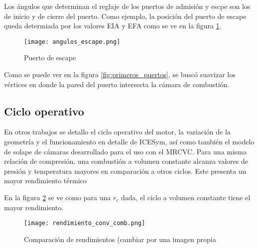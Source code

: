Los ángulos que determinan el reglaje de los puertos de admisión y escpe
son los de inicio y de cierre del puerto.
%
Como ejemplo, la posición del puerto de escape queda determiada por los 
valores EIA y EFA como se ve en la figura \ref{fig:angulos_escape}.

\begin{figure}
    \centering
    \texttt{[image: angulos\_escape.png]}
    \caption{Puerto de escape}
    \label{fig:angulos_escape}
\end{figure}

Como se puede ver en la figura \ref{fig:primeros_puertos}, se buscó suavizar
los vértices en donde la pared del puerto intersecta la cámara de combustión.
%


\subsection{Ciclo operativo}
En otros trabajos se detallo el ciclo operativo del motor, la variación de la
geometría y el funcionamiento en detalle de ICESym, así como también el modelo
de solape de cámaras desarrollado para el uso con el MRCVC.
%
Para una misma relación de compresión, una combustión a volumen constante
alcanza valores de presión y temperatura mayores en comparación a otros ciclos.
%
Este presenta un mayor rendimiento térmico


En la figura \ref{fig:comparacion_rendimientos} se ve como para una $r_c$ dada,
el ciclo a volumen constante tiene el mayor rendimiento.

\begin{figure}
    \centering
    \texttt{[image: rendimiento\_conv\_comb.png]}
    \caption{Comparación de rendimientos (cambiar por una imagen propia}
    \label{fig:comparacion_rendimientos}
\end{figure}


%
%
%
%

